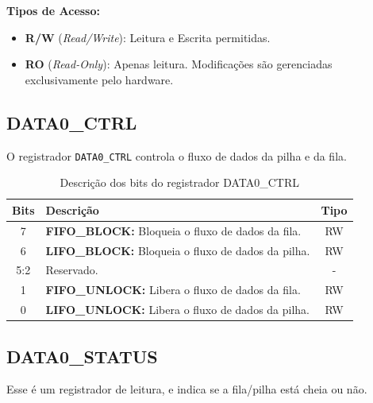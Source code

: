 \documentclass[12pt, a4paper]{article}
\begin{document}
	\vspace{0.3cm}
	\noindent
	\textbf{Tipos de Acesso:}
	\begin{itemize}
		\item \textbf{R/W} (\textit{Read/Write}): Leitura e Escrita permitidas.
		\item \textbf{RO} (\textit{Read-Only}): Apenas leitura. Modificações são gerenciadas exclusivamente pelo hardware.
	\end{itemize}
	
	\vspace{0.5cm}
	
\subsection{DATA0\_CTRL}

O registrador \texttt{DATA0\_CTRL} controla o fluxo de dados da pilha e da fila.

	\begin{table}[H]
		\centering
		\caption{Descrição dos bits do registrador DATA0\_CTRL}
		\vspace{0.2cm}
		\renewcommand{\arraystretch}{1.5}
		\setlength{\arrayrulewidth}{1pt} %
		\begin{tabular}{|c|p{10cm}|c|}
			\hline
			\textbf{Bits} & \textbf{Descrição} & \textbf{Tipo} \\ \hline
			7   & \textbf{FIFO\_BLOCK:} Bloqueia o fluxo de dados da fila. & RW \\ \hline
			6   & \textbf{LIFO\_BLOCK:} Bloqueia o fluxo de dados da pilha. & RW \\ \hline
			5:2 & Reservado. & -  \\ \hline
			1   & \textbf{FIFO\_UNLOCK:} Libera o fluxo de dados da fila. & RW \\ \hline
			0   & \textbf{LIFO\_UNLOCK:} Libera o fluxo de dados da pilha. & RW \\ \hline
		\end{tabular}
		\label{tab:data0_ctrl}
	\end{table}

\vspace{0.5cm}

\subsection{DATA0\_STATUS}

Esse é um registrador de leitura, e indica se a fila/pilha está cheia ou não.
\end{document}
